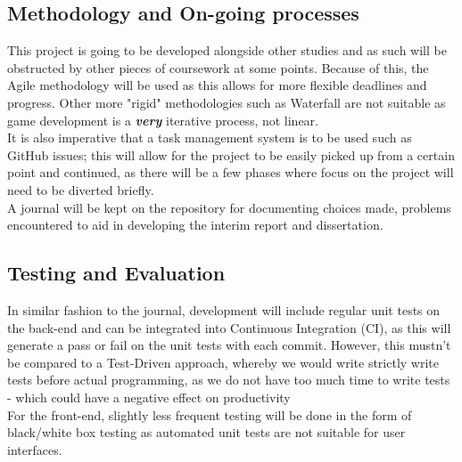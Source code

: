 \documentclass[11pt]{article}
\begin{document}
{\subsection*{Methodology and On-going processes}

This project is going to be developed alongside other studies and as such will be obstructed by other pieces of coursework at some points. Because of this, the Agile methodology will be used as this allows for more flexible deadlines and progress. Other more "rigid" methodologies such as Waterfall are not suitable as game development is a \textbf{\textit{very}} iterative process, not linear. \cite{iterative} \\ 


It is also imperative that a task management system is to be used such as GitHub issues; this will allow for the project to be easily picked up from a certain point and continued, as there will be a few phases where focus on the project will need to be diverted briefly. \\

A journal will be kept on the repository for documenting choices made, problems encountered to aid in developing the interim report and dissertation. \\

\subsection*{Testing and Evaluation}

In similar fashion to the journal, development will include regular unit tests on the back-end and can be integrated into Continuous Integration (CI), as this will generate a pass or fail on the unit tests with each commit. However, this mustn't be compared to a Test-Driven approach, whereby we would write strictly write tests before actual programming, as we do not have too much time to write tests - which could have a negative effect on productivity \cite{tdd_productivity}   \\


For the front-end, slightly less frequent testing will be done in the form of black/white box testing as automated unit tests are not suitable for user interfaces. 

}
\end{document}
